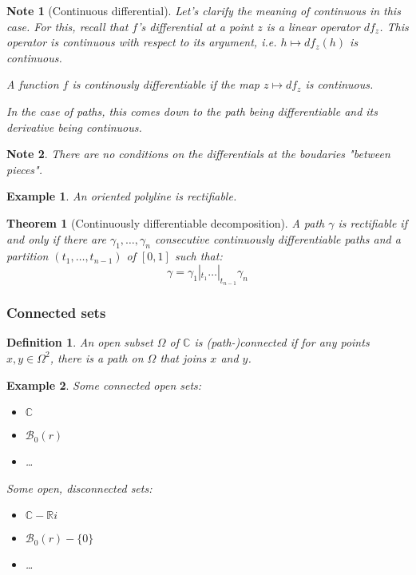 \documentclass{article}
\newtheorem*{defi}{Definition}
\newtheorem*{note}{Note}
\newtheorem*{example}{Example}
\newtheorem*{thm*}{Theorem}
\begin{document}
\begin{note}[Continuous differential]
    Let's clarify the meaning of continuous in this case. For this, recall that $f$'s differential at a point $z$ is a linear operator $df_z$. This operator is continuous with respect to its argument, i.e. $h \mapsto df_z(h)$ is continuous.

    A function $f$ is continously differentiable if the map $z \mapsto df_z$ is continuous.

    In the case of paths, this comes down to the path being differentiable and its derivative being continuous.
\end{note}

\begin{note}
    There are no conditions on the differentials at the boudaries "between pieces".
\end{note}

\begin{example}
    An oriented polyline is rectifiable.
\end{example}

\begin{thm*}[Continuously differentiable decomposition]
    A path $\gamma$ is rectifiable if and only if there are $\gamma_1, \dots, \gamma_n$ consecutive continuously differentiable paths and a partition $(t_1, \dots, t_{n-1})$ of $[0,1]$ such that:
    $$\gamma = \gamma_1 |_{t_1} \dots |_{t_{n-1}} \gamma_n$$
\end{thm*}

\subsubsection{Connected sets}

\begin{defi}
    An open subset $\Omega$ of $\mathbb{C}$ is (path-)connected if for any points $x,y \in \Omega^2$, there is a path on $\Omega$ that joins $x$ and $y$. 
\end{defi}

\begin{example}
    
    Some connected open sets:
    \begin{itemize}
        \item $\mathbb{C}$
        \item $\mathcal{B}_0(r)$
        \item \dots
    \end{itemize}
    Some open, disconnected sets:
    \begin{itemize}
        \item $\mathbb{C} -\mathbb{R}i$
        \item $\mathcal{B}_0(r) - \lbrace 0 \rbrace$
        \item \dots
    \end{itemize}
\end{example}
\end{document}
